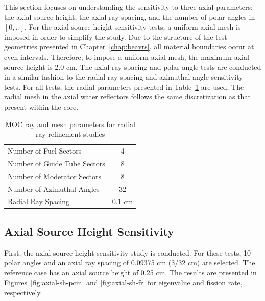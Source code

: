 This section focuses on understanding the sensitivity to three axial parameters: the axial source height, the axial ray spacing, and the number of polar angles in $[0, \pi]$. For the axial source height sensitivity tests, a uniform axial mesh is imposed in order to simplify the study. Due to the structure of the test geometries presented in Chapter~\ref{chap:beavrs}, all material boundaries occur at even intervals. Therefore, to impose a uniform axial mesh, the maximum axial source height is 2.0 cm. The axial ray spacing and polar angle tests are conducted in a similar fashion to the radial ray spacing and azimuthal angle sensitivity tests. For all tests, the radial parameters presented in Table~\ref{tab:axial-test-radial-params} are used. The radial mesh in the axial water reflectors follows the same discretization as that present within the core.

\begin{table}[ht]
	\centering
	\caption{MOC ray and mesh parameters for radial ray refinement studies}
	\medskip
	\begin{tabular}{lc}
		\hline
		Number of Fuel Sectors & 4 \\
		Number of Guide Tube Sectors & 8 \\
		Number of Moderator Sectors & 8 \\
		Number of Azimuthal Angles & 32 \\
		Radial Ray Spacing & 0.1 cm \\
		\hline
	\end{tabular}
	\label{tab:axial-test-radial-params}
\end{table}

\subsection{Axial Source Height Sensitivity}
\label{sec:axial-source-height-sensitivity}

First, the axial source height sensitivity study is conducted. For these tests, 10 polar angles and an axial ray spacing of 0.09375 cm (3/32 cm) are selected. The reference case has an axial source height of 0.25 cm. The results are presented in Figures~\ref{fig:axial-sh-pcm} and \ref{fig:axial-sh-fr} for eigenvalue and fission rate, respectively. 

